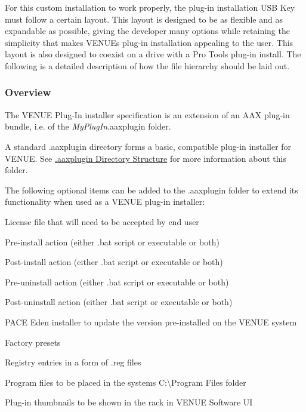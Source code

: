  For this custom installation to work properly, the plug-\/in installation U\+S\+B Key must follow a certain layout. This layout is designed to be as flexible and as expandable as possible, giving the developer many options while retaining the simplicity that makes V\+E\+N\+U\+E\textquotesingle{}s plug-\/in installation appealing to the user. This layout is also designed to coexist on a drive with a Pro Tools plug-\/in install. The following is a detailed description of how the file hierarchy should be laid out.

\hypertarget{a00377_subsection__aax_venue_guide__installer__overview}{}\subsubsection{Overview}\label{a00377_subsection__aax_venue_guide__installer__overview}
 The V\+E\+N\+U\+E Plug-\/\+In installer specification is an extension of an A\+A\+X plug-\/in bundle, i.\+e. of the {\itshape My\+Plug\+In}.aaxplugin folder.

 A standard .aaxplugin directory forms a basic, compatible plug-\/in installer for V\+E\+N\+U\+E. See \hyperlink{a00331_commoninterface_formatspecification__aaxplugin_directory_structure}{.aaxplugin Directory Structure} for more information about this folder.

 The following optional items can be added to the .aaxplugin folder to extend its functionality when used as a V\+E\+N\+U\+E plug-\/in installer\+: 
\begin{DoxyItemize}
\item License file that will need to be accepted by end user 
\item Pre-\/install action (either .bat script or executable or both) 
\item Post-\/install action (either .bat script or executable or both) 
\item Pre-\/uninstall action (either .bat script or executable or both) 
\item Post-\/uninstall action (either .bat script or executable or both) 
\item P\+A\+C\+E Eden installer to update the version pre-\/installed on the V\+E\+N\+U\+E system 
\item Factory presets 
\item Registry entries in a form of .reg files 
\item Program files to be placed in the system\textquotesingle{}s C\+:\textbackslash{}Program Files folder 
\item Plug-\/in thumbnails to be shown in the rack in V\+E\+N\+U\+E Software U\+I 
\end{DoxyItemize}


